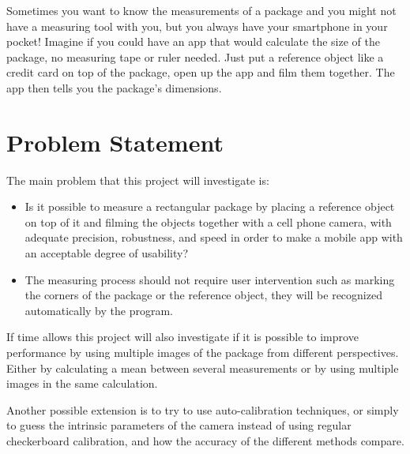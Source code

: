 Sometimes you want to know the measurements of a package and you might not have a measuring tool with you, but you always have your smartphone in your pocket! Imagine if you could have an app that would calculate the size of the package, no measuring tape or ruler needed. Just put a reference object like a credit card on top of the package, open up the app and film them together. The app then tells you the package’s dimensions. 
\section{Problem Statement}
The main problem that this project will investigate is:
\begin{itemize}
	\item Is it possible to measure a rectangular package by placing a reference object on top of it and filming the objects together with a cell phone camera, with adequate precision, robustness, and speed in order to make a mobile app with an acceptable degree of usability?
	\item The measuring process should not require user intervention such as marking the corners of the package or the reference object, they will be recognized automatically by the program.
\end{itemize}

If time allows this project will also investigate if it is possible to improve performance by using multiple images of the package from different perspectives.  Either by calculating a mean between several measurements or by using multiple images in the same calculation. 

Another possible extension is to try to use auto-calibration techniques, or simply to guess the intrinsic parameters of the camera instead of using regular checkerboard calibration, and how the accuracy of the different methods compare.

